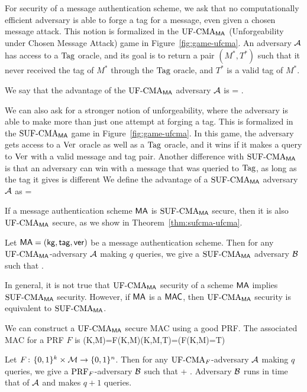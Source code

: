 For security of a message authentication scheme, we ask that no computationally efficient adversary is able to forge a tag for a message, even given a chosen message attack. This notion is formalized in the $\textnormal{UF-CMA}_{\mathsf{MA}}$ (Unforgeability under Chosen Message Attack) game in Figure~\ref{fig:game-ufcma}. An adversary ${\mathcal A}$ has access to a $\textnormal{Tag}$ oracle, and its goal is to return a pair $(M^*,T^*)$ such that it never received the tag of $M^*$ through the $\textnormal{Tag}$ oracle, and $T^*$ is a valid tag of $M^*$. 

We say that the advantage of the $\textnormal{UF-CMA}_{\mathsf{MA}}$ adversary ${\mathcal A}$ is 
\bnm
  \AdvUFCMA{\MA}{\advA} = .
\enm

We can also ask for a stronger notion of unforgeability, where the adversary is able to make more than just one attempt at forging a tag. This is formalized in the $\textnormal{SUF-CMA}_{\mathsf{MA}}$ game in Figure~\ref{fig:game-ufcma}. In this game, the adversary gets access to a $\textnormal{Ver}$ oracle as well as a $\textnormal{Tag}$ oracle, and it wins if it makes a query to $\textnormal{Ver}$ with a valid message and tag pair. Another difference with $\textnormal{SUF-CMA}_{\mathsf{MA}}$ is that an adversary can win with a message that was queried to $\textnormal{Tag}$, as long as the tag it gives is different  We define the advantage of a $\textnormal{SUF-CMA}_{\mathsf{MA}}$ adversary ${\mathcal A}$ as 
\bnm
  \AdvSUFCMA{\MA}{\advA} =  
\enm

If a message authentication scheme $\mathsf{MA}$ is $\textnormal{SUF-CMA}_{\mathsf{MA}}$ secure, then it is also $\textnormal{UF-CMA}_{\mathsf{MA}}$ secure, as we show in Theorem~\ref{thm:sufcma-ufcma}.  
\begin{theorem}
	\label{thm:sufcma-ufcma}
Let $\mathsf{MA} = ({\sf kg},\mathsf{tag},\mathsf{ver})$ be a message authentication scheme. Then for any $\textnormal{UF-CMA}_{\mathsf{MA}}$-adversary ${\mathcal A}$ making $q$ queries, we give a $\textnormal{SUF-CMA}_{\mathsf{MA}}$ adversary ${\mathcal B}$ such that
\bnm
	\AdvUFCMA{\MA}{\advA} \le \AdvSUFCMA{\MA}{\advB} \;.
\enm
\end{theorem}

In general, it is not true that $\textnormal{UF-CMA}_{\mathsf{MA}}$ security of a scheme $\mathsf{MA}$ implies $\textnormal{SUF-CMA}_{\mathsf{MA}}$ security. However, if $\mathsf{MA}$ is a $\mathsf{MAC}$, then $\textnormal{UF-CMA}_{\mathsf{MA}}$ security is equivalent to $\textnormal{SUF-CMA}_{\mathsf{MA}}$. 

We can construct a $\textnormal{UF-CMA}_{\mathsf{MA}}$ secure MAC using a good PRF. The associated MAC for a PRF $F$ is
\bnm
\mtag(K,M)=F(K,M)\myInd\myInd \ver(K,M,T)=(F(K,M)=T)
\enm
{}
\begin{theorem}
Let $F{{\kern .05em}\colon{\kern .05em}}\{0,1\}^k\times{\cal M}\rightarrow\{0,1\}^n$. Then for any
$\textnormal{UF-CMA}_F$-adversary ${\mathcal A}$ making $q$ queries, we give a $\textnormal{PRF}_F$-adversary ${\mathcal B}$ such that
\bnm
   \le {} +  \;.
\enm
Adversary ${\mathcal B}$ runs in time that of ${\mathcal A}$ and makes $q+1$ queries.
\label{thm:prf-ufcma}
\end{theorem}

